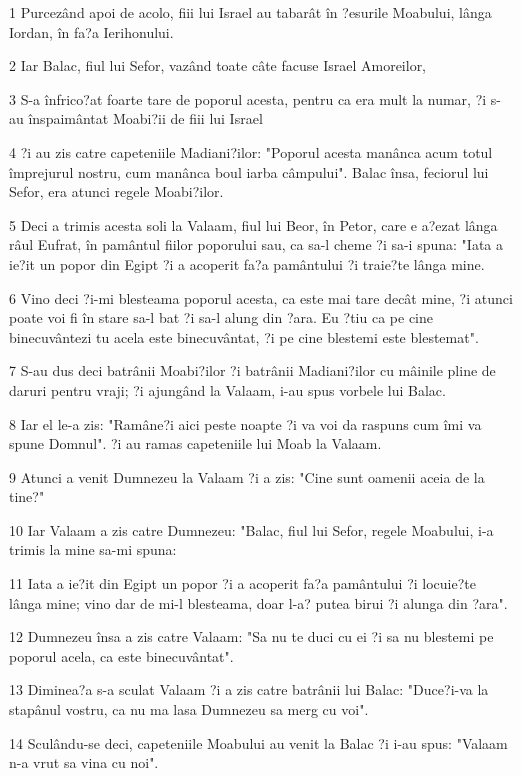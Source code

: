 \par 1 Purcezând apoi de acolo, fiii lui Israel au tabarât în ?esurile Moabului, lânga Iordan, în fa?a Ierihonului.
\par 2 Iar Balac, fiul lui Sefor, vazând toate câte facuse Israel Amoreilor,
\par 3 S-a înfrico?at foarte tare de poporul acesta, pentru ca era mult la numar, ?i s-au înspaimântat Moabi?ii de fiii lui Israel
\par 4 ?i au zis catre capeteniile Madiani?ilor: "Poporul acesta manânca acum totul împrejurul nostru, cum manânca boul iarba câmpului". Balac însa, feciorul lui Sefor, era atunci regele Moabi?ilor.
\par 5 Deci a trimis acesta soli la Valaam, fiul lui Beor, în Petor, care e a?ezat lânga râul Eufrat, în pamântul fiilor poporului sau, ca sa-l cheme ?i sa-i spuna: "Iata a ie?it un popor din Egipt ?i a acoperit fa?a pamântului ?i traie?te lânga mine.
\par 6 Vino deci ?i-mi blesteama poporul acesta, ca este mai tare decât mine, ?i atunci poate voi fi în stare sa-l bat ?i sa-l alung din ?ara. Eu ?tiu ca pe cine binecuvântezi tu acela este binecuvântat, ?i pe cine blestemi este blestemat".
\par 7 S-au dus deci batrânii Moabi?ilor ?i batrânii Madiani?ilor cu mâinile pline de daruri pentru vraji; ?i ajungând la Valaam, i-au spus vorbele lui Balac.
\par 8 Iar el le-a zis: "Ramâne?i aici peste noapte ?i va voi da raspuns cum îmi va spune Domnul". ?i au ramas capeteniile lui Moab la Valaam.
\par 9 Atunci a venit Dumnezeu la Valaam ?i a zis: "Cine sunt oamenii aceia de la tine?"
\par 10 Iar Valaam a zis catre Dumnezeu: "Balac, fiul lui Sefor, regele Moabului, i-a trimis la mine sa-mi spuna:
\par 11 Iata a ie?it din Egipt un popor ?i a acoperit fa?a pamântului ?i locuie?te lânga mine; vino dar de mi-l blesteama, doar l-a? putea birui ?i alunga din ?ara".
\par 12 Dumnezeu însa a zis catre Valaam: "Sa nu te duci cu ei ?i sa nu blestemi pe poporul acela, ca este binecuvântat".
\par 13 Diminea?a s-a sculat Valaam ?i a zis catre batrânii lui Balac: "Duce?i-va la stapânul vostru, ca nu ma lasa Dumnezeu sa merg cu voi".
\par 14 Sculându-se deci, capeteniile Moabului au venit la Balac ?i i-au spus: "Valaam n-a vrut sa vina cu noi".
